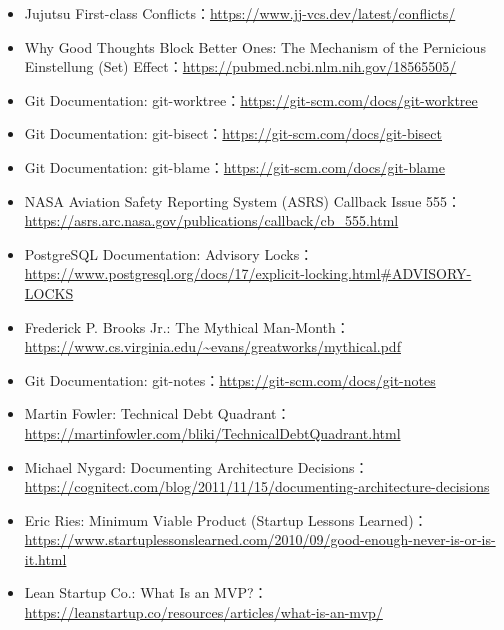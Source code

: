 \documentclass[UTF8,a4paper,11pt,fontset=fandol]{ctexart}
\begin{document}
\begin{itemize}
\item Jujutsu First-class Conflicts：\url{https://www.jj-vcs.dev/latest/conflicts/}

\item Why Good Thoughts Block Better Ones: The Mechanism of the Pernicious Einstellung (Set) Effect：\url{https://pubmed.ncbi.nlm.nih.gov/18565505/}

\item Git Documentation: git-worktree：\url{https://git-scm.com/docs/git-worktree}

\item Git Documentation: git-bisect：\url{https://git-scm.com/docs/git-bisect}

\item Git Documentation: git-blame：\url{https://git-scm.com/docs/git-blame}

\item NASA Aviation Safety Reporting System (ASRS) Callback Issue 555：\url{https://asrs.arc.nasa.gov/publications/callback/cb_555.html}

\item PostgreSQL Documentation: Advisory Locks：\url{https://www.postgresql.org/docs/17/explicit-locking.html#ADVISORY-LOCKS}

\item Frederick P. Brooks Jr.: The Mythical Man-Month：\url{https://www.cs.virginia.edu/~evans/greatworks/mythical.pdf}

\item Git Documentation: git-notes：\url{https://git-scm.com/docs/git-notes}

\item Martin Fowler: Technical Debt Quadrant：\url{https://martinfowler.com/bliki/TechnicalDebtQuadrant.html}

\item Michael Nygard: Documenting Architecture Decisions：\url{https://cognitect.com/blog/2011/11/15/documenting-architecture-decisions}

\item Eric Ries: Minimum Viable Product (Startup Lessons Learned)：\url{https://www.startuplessonslearned.com/2010/09/good-enough-never-is-or-is-it.html}

\item Lean Startup Co.: What Is an MVP?：\url{https://leanstartup.co/resources/articles/what-is-an-mvp/}

\end{itemize}
\end{document}
